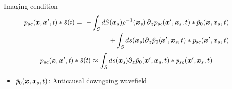 \documentclass[xcolor=dvipsnames]{beamer}
\begin{document}
\begin{frame}{Imaging condition}
%
\begin{eqnarray}
  p_{sc}(\xx,\xx',t)*\hat{s}(t)=\
    -  \int_S dS(\xx_s) \rho^{-1}(\xx_s)\, \d_z p_{sc}(\xx',\xx_s,t)*\hat{p}_0(\xx,\xx_s,t) \nonumber\\
   + \int_S ds(\xx_s) \d_z \hat{p}_0(\xx',\xx_s,t)*p_{sc}(\xx',\xx_s,t) 
\end{eqnarray}
%
%
\begin{eqnarray}
  p_{sc}(\xx,\xx',t)*\hat{s}(t) \approx
    \int_S ds(\xx_s) \d_z \hat{p}_0(\xx',\xx_s,t)*p_{sc}(\xx',\xx_s,t) 
\end{eqnarray}
%
\begin{itemize}
  \item $\hat{p}_0(\xx,\xx_s,t)$: Anticausal downgoing wavefield 
\end{itemize}
\end{frame}
\end{document}
